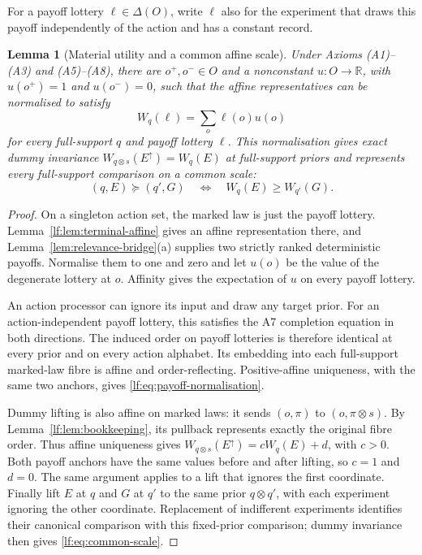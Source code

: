 \documentclass[11pt,a4paper]{article}
\newtheorem{lemma}[theorem]{Lemma}
\theoremstyle{definition}
\newcommand{\D}{\Delta}
\newcommand{\R}{\mathbb R}
\newcommand{\1}{\mathbf 1}
\begin{document}
For a payoff lottery $\ell\in\D(O)$, write $\ell$ also for the experiment
that draws this payoff independently of the action and has a constant record.

\begin{lemma}[Material utility and a common affine scale]\label{lf:lem:material-scale}
Under Axioms \textup{(A1)--(A3)} and \mbox{\textup{(A5)--(A8)}}, there are
$o^+,o^-\in O$ and a nonconstant $u:O\to\R$, with $u(o^+)=1$ and
$u(o^-)=0$, such that the affine representatives can be normalised to satisfy
\begin{equation}
W_q(\ell)=\sum_o\ell(o)u(o)
\label{lf:eq:payoff-normalisation}
\end{equation}
for every full-support $q$ and payoff lottery $\ell$.
This normalisation gives exact dummy invariance
$W_{q\otimes s}(E^\uparrow)=W_q(E)$ at full-support priors and represents
every full-support comparison on a common scale:
\begin{equation}
(q,E)\succeq(q',G)
\quad\Longleftrightarrow\quad W_q(E)\ge W_{q'}(G).
\label{lf:eq:common-scale}
\end{equation}
\end{lemma}

\begin{proof}
On a singleton action set, the marked law is just the payoff lottery.
Lemma~\ref{lf:lem:terminal-affine} gives an affine representation there,
and Lemma~\ref{lem:relevance-bridge}\textup{(a)} supplies two strictly
ranked deterministic payoffs.  Normalise them to one and zero and let $u(o)$
be the value of the degenerate lottery at $o$.  Affinity gives the expectation
of $u$ on every payoff lottery.

An action processor can ignore its input and draw any target prior.
For an action-independent payoff lottery, this satisfies the A7 completion
equation in both directions.  The induced order on payoff lotteries is
therefore identical at every prior and on every action alphabet.
Its embedding into each full-support marked-law fibre is affine and
order-reflecting.  Positive-affine uniqueness, with the same two anchors,
gives \eqref{lf:eq:payoff-normalisation}.

Dummy lifting is also affine on marked laws: it sends $(o,\pi)$ to
$(o,\pi\otimes s)$.  By Lemma~\ref{lf:lem:bookkeeping}, its pullback
represents exactly the original fibre order.  Thus affine uniqueness gives
$W_{q\otimes s}(E^\uparrow)=cW_q(E)+d$, with $c>0$.
Both payoff anchors have the same values before and after lifting, so
$c=1$ and $d=0$.  The same argument applies to a lift that ignores the first
coordinate.  Finally lift $E$ at $q$ and $G$ at $q'$ to the same prior
$q\otimes q'$, with each experiment ignoring the other coordinate.
Replacement of indifferent experiments identifies their canonical comparison
with this fixed-prior comparison; dummy invariance then gives
\eqref{lf:eq:common-scale}.
\end{proof}
\end{document}
